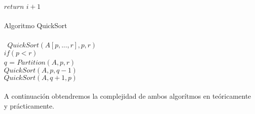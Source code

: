 \documentclass[12pt,twoside]{article}
\begin{document}
\hspace*{2cm}$return$ $i+1$\\\\
Algoritmo QuickSort\\\\\
\hspace*{1cm}$QuickSort(A[p,...,r],p,r)$\\
\hspace*{1cm}$if(p<r)$\\
\hspace*{2cm}$q$ = $Partition(A,p,r)$\\
\hspace*{2cm}$QuickSort(A,p,q-1)$\\
\hspace*{2cm}$QuickSort(A,q+1,p)$\\\\
A continuación obtendremos la complejidad de ambos algor\'itmos en te\'oricamente y pr\'acticamente. \newpage
\end{document}
